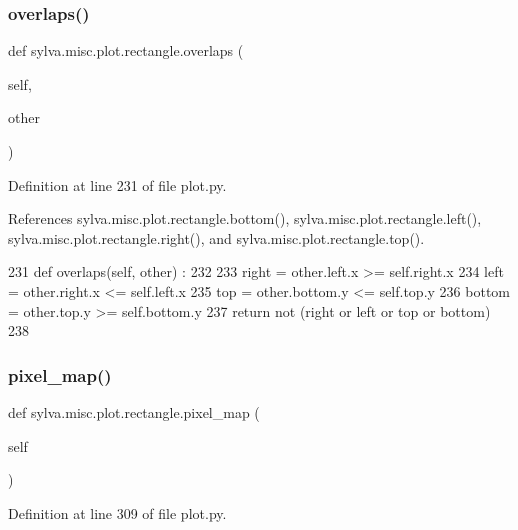 \subsubsection{\texorpdfstring{overlaps()}{overlaps()}}
{\footnotesize\ttfamily def sylva.\+misc.\+plot.\+rectangle.\+overlaps (\begin{DoxyParamCaption}\item[{}]{self,  }\item[{}]{other }\end{DoxyParamCaption})}



Definition at line 231 of file plot.\+py.



References sylva.\+misc.\+plot.\+rectangle.\+bottom(), sylva.\+misc.\+plot.\+rectangle.\+left(), sylva.\+misc.\+plot.\+rectangle.\+right(), and sylva.\+misc.\+plot.\+rectangle.\+top().


\begin{DoxyCode}
231     \textcolor{keyword}{def }overlaps(self, other) :
232 
233       right = other.left.x >= self.right.x
234       left = other.right.x <= self.left.x
235       top = other.bottom.y <= self.top.y
236       bottom = other.top.y >= self.bottom.y
237       \textcolor{keywordflow}{return} \textcolor{keywordflow}{not} (right \textcolor{keywordflow}{or} left \textcolor{keywordflow}{or} top \textcolor{keywordflow}{or} bottom)
238 
\end{DoxyCode}
\mbox{\label{classsylva_1_1misc_1_1plot_1_1rectangle_a6395db39d40526291589390d31437f80}} 
\subsubsection{\texorpdfstring{pixel\+\_\+map()}{pixel\_map()}}
{\footnotesize\ttfamily def sylva.\+misc.\+plot.\+rectangle.\+pixel\+\_\+map (\begin{DoxyParamCaption}\item[{}]{self }\end{DoxyParamCaption})}



Definition at line 309 of file plot.\+py.




